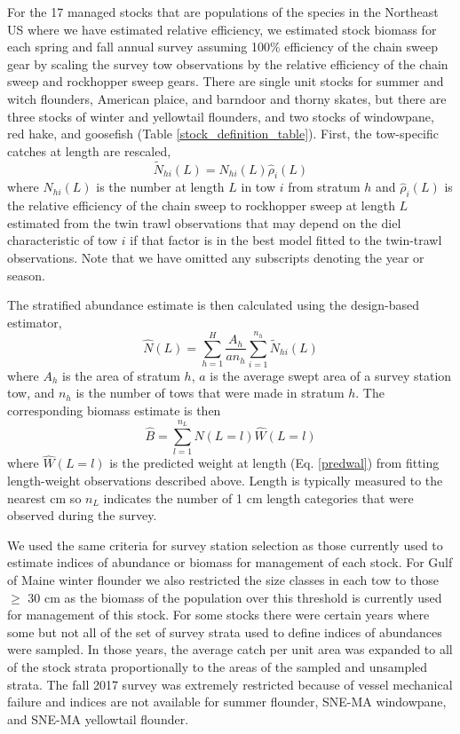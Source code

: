\documentclass[
  12pt,
]{article}
\begin{document}
For the 17 managed stocks that are populations of the species in the
Northeast US where we have estimated relative efficiency, we estimated
stock biomass for each spring and fall annual survey assuming 100\%
efficiency of the chain sweep gear by scaling the survey tow
observations by the relative efficiency of the chain sweep and
rockhopper sweep gears. There are single unit stocks for summer and
witch flounders, American plaice, and barndoor and thorny skates, but
there are three stocks of winter and yellowtail flounders, and two
stocks of windowpane, red hake, and goosefish (Table
\ref{stock_definition_table}). First, the tow-specific catches at length
are rescaled, \begin{equation}\label{nal}
\widetilde N_{hi}\left(L\right) = N_{hi}\left(L\right)\widehat \rho_i\left(L\right)
\end{equation} where \(N_{hi}(L)\) is the number at length \(L\) in tow
\(i\) from stratum \(h\) and \(\widehat \rho_i\left(L\right)\) is the
relative efficiency of the chain sweep to rockhopper sweep at length
\(L\) estimated from the twin trawl observations that may depend on the
diel characteristic of tow \(i\) if that factor is in the best model
fitted to the twin-trawl observations. Note that we have omitted any
subscripts denoting the year or season.

The stratified abundance estimate is then calculated using the
design-based estimator, \begin{equation}\label{Nal_estimate}
 \widehat N(L) = \sum^H_{h=1} \frac{A_h}{an_h}\sum^{n_h}_{i=1} \widetilde N_{hi}(L)
\end{equation} where \(A_h\) is the area of stratum \(h\), \(a\) is the
average swept area of a survey station tow, and \(n_h\) is the number of
tows that were made in stratum \(h\). The corresponding biomass estimate
is then \begin{equation}\label{biomass_estimate}
 \widehat B = \sum^{n_L}_{l=1} \widehat N(L = l) \widehat W(L=l)
\end{equation} where \(\widehat W(L=l)\) is the predicted weight at
length (Eq. \ref{predwal}) from fitting length-weight observations
described above. Length is typically measured to the nearest cm so
\(n_L\) indicates the number of 1 cm length categories that were
observed during the survey.

We used the same criteria for survey station selection as those
currently used to estimate indices of abundance or biomass for
management of each stock. For Gulf of Maine winter flounder we also
restricted the size classes in each tow to those \(\geq\) 30 cm as the
biomass of the population over this threshold is currently used for
management of this stock. For some stocks there were certain years where
some but not all of the set of survey strata used to define indices of
abundances were sampled. In those years, the average catch per unit area
was expanded to all of the stock strata proportionally to the areas of
the sampled and unsampled strata. The fall 2017 survey was extremely
restricted because of vessel mechanical failure and indices are not
available for summer flounder, SNE-MA windowpane, and SNE-MA yellowtail
flounder.
\end{document}
